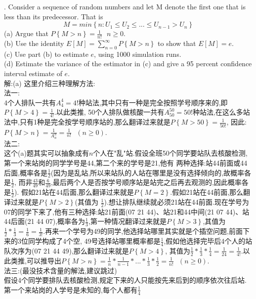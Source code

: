 \documentclass{book}
\begin{document}
. Consider a sequence of random numbers and let M denote the first one that is less than its predecessor. That is
$$
    M = min\left\{n:U_{1} \leq U_{2} \leq ... \leq U_{n-1} > U_{n}\right\}
$$
(a) Argue that $P\left\{M > n\right\} = \frac{1}{n!} \ \ \ n \geq 0$.  \\
(b) Use the identity $E[M] = \sum_{n=0}^{\infty}P\left\{M > n\right\}$ to show that $E[M] = e$. \\
(c) Use part (b) to estimate $e$, using 1000 simulation runs. \\
(d) Estimate the variance of the estimator in (c) and give a 95 percent confidence interval estimate of $e$. \\
解:(a) 这里介绍三种理解方法: \\
法一: \\
4个人排队一共有$A_{4}^{4} = 4!$种站法,其中只有一种是完全按照学号顺序来的,即$P\left\{M > 4\right\} = \frac{1}{4!}$.以此类推,
50个人排队做核酸一共有$A_{50}^{50} = 50!$种站法,在这么多站法中,只有1种是完全按学号顺序站的,那么翻译过来就是$P\left\{M > 50
    \right\} = \frac{1}{50!}$, 因此:$P\left\{M > n\right\} = \frac{1}{A_{n}^{n}} = \frac{1}{n!} \ \ \ (n \geq 0)$. \\
法二: \\
这个(a)题其实可以抽象成有$n$个人在"乱"站.假设全班50个同学要站队去核酸检测,第一个来站岗的同学学号是44,第二个来的学号是21,他有
两种选择:站44前面或44后面,概率各是$\frac{1}{2}$(因为是乱站,所以来站队的人站在哪里是没有选择倾向的,故概率各是$\frac{1}{2}$,
而非$\frac{43}{49}$和$\frac{6}{49}$,最后两个人是否按学号顺序站是站完之后再去观测的,因此概率各是$\frac{1}{2}$).
假如21站在44后面,那么翻译过来就是$P\left\{M = 2\right\}$.假如21站在44前面,那么翻译过来就是$P\left\{M > 2\right\}$(其值为
$\frac{1}{2}$).想让排队继续就必须21站在44前面.现在学号为07的同学下来了,他有三种选择:站21前面(07 21 44)、站21和44中间(21 07
44)、站44后面(21 44 07),概率各为$\frac{1}{3}$,第一种情况翻译过来就是$P\left\{M > 3\right\}$,其值为$\frac{1}{2} * \frac
    {1}{3} = \frac{1}{6} = \frac{1}{3!}$.再来一个学号为49的同学,他选择站哪里其实就是个插空问题,前面下来的3位同学构成了4个空,
49号选择站哪里概率都是$\frac{1}{4}$,假如他选择完毕后4个人的站队次序为(07 21 44 49),那么翻译过来就是$P\left\{M > 4\right\}$,
其值为$\frac{1}{2} * \frac{1}{3} * \frac{1}{4}=\frac{1}{24} = \frac{1}{4!}$.以此类推,可以推导出$P\left\{M > n\right\}
    = \frac{1}{n}*\frac{1}{n-1}*...*\frac{1}{3}*\frac{1}{2} = \frac{1}{n!} \ \ \ (n \geq 0)$.  \\
法三:(最没技术含量的解法,建议跳过) \\
假设4个同学要排队去核酸检测,规定下来的人只能按先来后到的顺序依次往后站.第一个来站岗的人学号是未知的,每个人都有$\frac{1}{4}$
\end{document}
